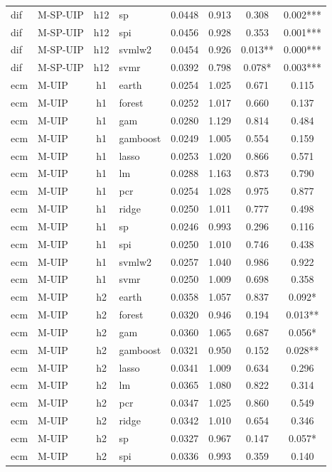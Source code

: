 \begin{ThreePartTable}
\begin{longtable}[t]{llclcccc}
dif & M-SP-UIP & h12 & sp & 0.0448 & 0.913 & 0.308 & 0.002***\\
dif & M-SP-UIP & h12 & spi & 0.0456 & 0.928 & 0.353 & 0.001***\\
dif & M-SP-UIP & h12 & svmlw2 & 0.0454 & 0.926 & 0.013** & 0.000***\\
dif & M-SP-UIP & h12 & svmr & 0.0392 & 0.798 & 0.078* & 0.003***\\
\addlinespace
ecm & M-UIP & h1 & earth & 0.0254 & 1.025 & 0.671 & 0.115\\
ecm & M-UIP & h1 & forest & 0.0252 & 1.017 & 0.660 & 0.137\\
ecm & M-UIP & h1 & gam & 0.0280 & 1.129 & 0.814 & 0.484\\
ecm & M-UIP & h1 & gamboost & 0.0249 & 1.005 & 0.554 & 0.159\\
ecm & M-UIP & h1 & lasso & 0.0253 & 1.020 & 0.866 & 0.571\\
ecm & M-UIP & h1 & lm & 0.0288 & 1.163 & 0.873 & 0.790\\
ecm & M-UIP & h1 & pcr & 0.0254 & 1.028 & 0.975 & 0.877\\
ecm & M-UIP & h1 & ridge & 0.0250 & 1.011 & 0.777 & 0.498\\
ecm & M-UIP & h1 & sp & 0.0246 & 0.993 & 0.296 & 0.116\\
ecm & M-UIP & h1 & spi & 0.0250 & 1.010 & 0.746 & 0.438\\
ecm & M-UIP & h1 & svmlw2 & 0.0257 & 1.040 & 0.986 & 0.922\\
ecm & M-UIP & h1 & svmr & 0.0250 & 1.009 & 0.698 & 0.358\\
\addlinespace
ecm & M-UIP & h2 & earth & 0.0358 & 1.057 & 0.837 & 0.092*\\
ecm & M-UIP & h2 & forest & 0.0320 & 0.946 & 0.194 & 0.013**\\
ecm & M-UIP & h2 & gam & 0.0360 & 1.065 & 0.687 & 0.056*\\
ecm & M-UIP & h2 & gamboost & 0.0321 & 0.950 & 0.152 & 0.028**\\
ecm & M-UIP & h2 & lasso & 0.0341 & 1.009 & 0.634 & 0.296\\
ecm & M-UIP & h2 & lm & 0.0365 & 1.080 & 0.822 & 0.314\\
ecm & M-UIP & h2 & pcr & 0.0347 & 1.025 & 0.860 & 0.549\\
ecm & M-UIP & h2 & ridge & 0.0342 & 1.010 & 0.654 & 0.346\\
ecm & M-UIP & h2 & sp & 0.0327 & 0.967 & 0.147 & 0.057*\\
ecm & M-UIP & h2 & spi & 0.0336 & 0.993 & 0.359 & 0.140\\

\end{longtable}
\end{ThreePartTable}
